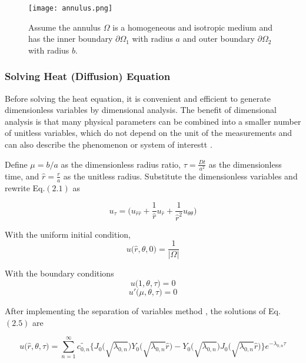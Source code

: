 \clearpage


\begin{figure}[h!]
  \begin{center}
    \texttt{[image: annulus.png]}
    \caption{Assume the annulus $\Omega$ is a homogeneous and
      isotropic medium and has the inner boundary $\partial \Omega_1$
      with radius $a$ and outer boundary $\partial \Omega_2$ with
      radius $b$.}
  \end{center}
\end{figure}



\subsubsection{Solving Heat (Diffusion) Equation}

Before solving the heat equation, it is convenient and efficient to
generate dimensionless variables by dimensional analysis. The benefit
of dimensional analysis is that many physical parameters can be
combined into a smaller number of unitless variables, which do not
depend on the unit of the measurements and can also describe the
phenomenon or system of interestt \cite{barenblatt1996scaling}.


Define $\mu = b/a$ as the dimensionless radius ratio, $\tau =
\frac{Dt}{a^2}$ as the dimensionless time, and $\hat r = \frac{r}{a}$
as the unitless radius. Substitute the dimensionless variables and
rewrite Eq.$(2.1)$ as

\begin{equation}
  u_\tau = \big(u_{\hat r \hat r} + \frac{1}{\hat r} u_{\hat r} + \frac{1}{\hat r ^2} u_{\theta\theta}\big)
\end{equation}

With the uniform initial condition,
$$u\big(\hat r, \theta, 0\big) = \frac{1}{|\Omega|}$$

With the boundary conditions
$$u\big(1, \theta, \tau\big) = 0$$
$$u'\big(\mu, \theta, \tau \big) = 0$$

\clearpage

After implementing the separation of variables method
\cite{crank1979mathematics}, the solutions of Eq.$(2.5)$ are

\begin{equation}
  u\big(\hat r, \theta, \tau \big) = \sum_{n=1}^{\infty}
  \tilde{c_{0,n}} \bigg\{J_0\big(\sqrt{\lambda_{0,n}}\big)
  Y_0\big(\sqrt{\lambda_{0,n}} \hat r\big) -
  Y_0\big(\sqrt{\lambda_{0,n}}\big) J_0\big(\sqrt{\lambda_{0,n}} \hat
  r\big)\bigg\} e^{-\lambda_{0,n}\tau}
\end{equation}

